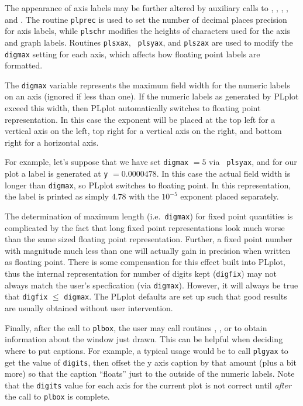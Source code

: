 The appearance of axis labels may be further altered by auxiliary calls to
, , , , and .
The routine {\tt plprec} is used to set the number of decimal places
precision for axis labels, while {\tt plschr} modifies the heights of
characters used for the axis and graph labels.  Routines {\tt plsxax}, {\tt
plsyax}, and {\tt plszax} are used to modify the {\tt digmax} setting for
each axis, which affects how floating point labels are formatted.

The {\tt digmax} variable represents the maximum field width for the
numeric labels on an axis (ignored if less than one).  If the numeric
labels as generated by PLplot exceed this width, then PLplot automatically
switches to floating point representation.  In this case the exponent will
be placed at the top left for a vertical axis on the left, top right for
a vertical axis on the right, and bottom right for a horizontal axis. 

For example, let's suppose that we have set {\tt digmax} $ = 5$ via {\tt
plsyax}, and for our plot a label is generated at {\tt y} $ = 0.0000478$.  In
this case the actual field width is longer than {\tt digmax}, so PLplot
switches to floating point.  In this representation, the label is printed as
simply $4.78$ with the $10^{-5}$ exponent placed separately.

The determination of maximum length (i.e.~{\tt digmax}) for fixed point
quantities is complicated by the fact that long fixed point representations
look much worse than the same sized floating point representation.
Further, a fixed point number with magnitude much less than one will
actually gain in precision when written as floating point.  There is some
compensation for this effect built into PLplot, thus the internal
representation for number of digits kept ({\tt digfix}) may not always
match the user's specfication (via {\tt digmax}).  However, it will always
be true that {\tt digfix} $\le$ {\tt digmax}.  The PLplot defaults are
set up such that good results are usually obtained without user
intervention. 

Finally, after the call to {\tt plbox}, the user may call routines
, , or  to obtain information about the
window just drawn.  This can be helpful when deciding where to put
captions.  For example, a typical usage would be to call {\tt plgyax} to
get the value of {\tt digits}, then offset the y axis caption by that amount
(plus a bit more) so that the caption ``floats'' just to the outside of the
numeric labels.  Note that the {\tt digits} value for each axis for the
current plot is not correct until {\em after\/} the call to {\tt plbox} is
complete. 

